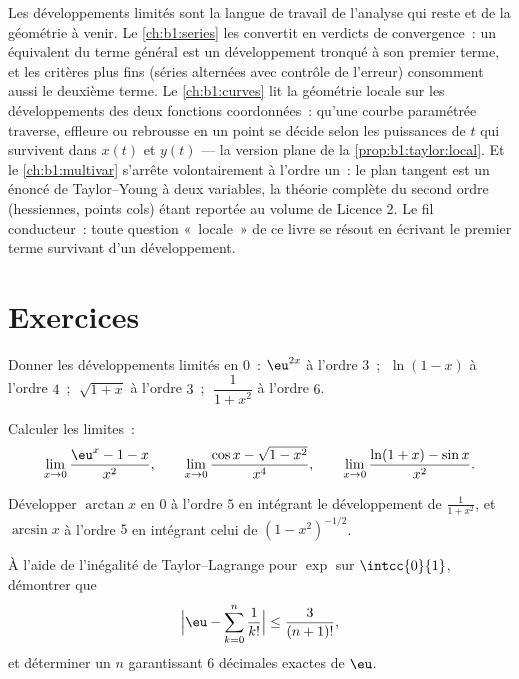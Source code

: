 \begin{remark}
Les développements limités sont la langue de travail de l'analyse qui
reste et de la géométrie à venir. Le \cref{ch:b1:series} les convertit
en verdicts de convergence~: un équivalent du terme général est un
développement tronqué à son premier terme, et les critères plus fins
(séries alternées avec contrôle de l'erreur) consomment aussi le
deuxième terme. Le \cref{ch:b1:curves} lit la géométrie locale sur les
développements des deux fonctions coordonnées~: qu'une courbe
paramétrée traverse, effleure ou rebrousse en un point se décide selon
les puissances de $t$ qui survivent dans $x(t)$ et $y(t)$ --- la
version plane de la \cref{prop:b1:taylor:local}. Et le
\cref{ch:b1:multivar} s'arrête volontairement à l'ordre un~: le plan
tangent est un énoncé de Taylor--Young à deux variables, la théorie
complète du second ordre (hessiennes, points cols) étant reportée au
volume de Licence 2. Le fil conducteur~: toute question «~locale~» de
ce livre se résout en écrivant le premier terme survivant d'un
développement.
\end{remark}

\section{Exercices}

\begin{exercise}[$\star$]\label{exo:b1:taylor:1}
Donner les développements limités en $0$~: $\eu^{2x}$ à l'ordre $3$~;
$\;\ln(1 - x)$ à l'ordre $4$~; $\;\sqrt{1 + x}$ à l'ordre $3$~;
$\;\dfrac{1}{1 + x^2}$ à l'ordre $6$.
\end{exercise}

\begin{exercise}[$\star$]\label{exo:b1:taylor:2}
Calculer les limites~:
\[
\lim_{x\to 0} \frac{\eu^x - 1 - x}{x^2},
\qquad
\lim_{x\to 0} \frac{\cos x - \sqrt{1 - x^2}}{x^4},
\qquad
\lim_{x\to 0} \frac{\ln(1+x) - \sin x}{x^2}.
\]
\end{exercise}

\begin{exercise}[$\star$]\label{exo:b1:taylor:3}
Développer $\arctan x$ en $0$ à l'ordre $5$ en intégrant le
développement de $\frac{1}{1 + x^2}$, et $\arcsin x$ à l'ordre $5$ en
intégrant celui de $(1 - x^2)^{-1/2}$.
\end{exercise}

\begin{exercise}[$\star$]\label{exo:b1:taylor:4}
À l'aide de l'inégalité de Taylor--Lagrange pour $\exp$ sur
$\intcc{0}{1}$, démontrer que
\[
\Bigl| \eu - \sum_{k=0}^{n} \frac{1}{k!} \Bigr| \leq
\frac{3}{(n+1)!},
\]
et déterminer un $n$ garantissant $6$ décimales exactes de $\eu$.
\end{exercise}

